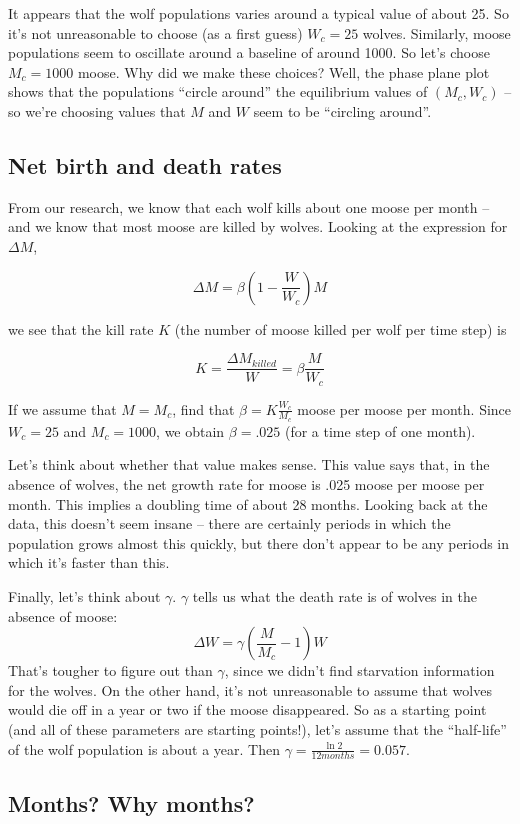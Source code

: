 \documentclass{tufte-handout}
\begin{document}
 It appears that the wolf populations varies around a typical value of about 25.  So it's not unreasonable to choose (as a first guess) $W_c = 25$ wolves.  Similarly, moose populations seem to oscillate around a baseline of around 1000.  So let's choose $M_c = 1000$ moose.  Why did we make these choices?  Well, the phase plane plot shows that the populations ``circle around'' the equilibrium values of $(M_c,W_c)$ -- so we're choosing values that $M$ and $W$ seem to be ``circling around''.

\subsection{Net birth and death rates}
From our research, we know that each wolf kills about one moose per month -- and we know that most moose are killed by wolves.  Looking at the expression for $\Delta M$, 

$$\Delta M = \beta(1-\frac{W}{W_c})M$$

we see that the kill rate $K$ (the number of moose killed per wolf per time step) is 

$$K = \frac{\Delta M_{killed}}{W} = \beta \frac{M}{W_c}$$

If we assume that $M=M_c$, find that  $ \beta = K \frac{W_c}{M_c}$ moose per moose per month.  Since $W_c = 25$ and $M_c = 1000$, we obtain $\beta = .025$ (for a time step of one month). 

Let's think about whether that value makes sense.  This value says that, in the absence of wolves, the net growth rate for moose is .025 moose per moose per month.  This implies a doubling time of about 28 months.   Looking back at the data, this doesn't seem insane -- there are certainly periods in which the population grows almost this quickly, but there don't appear to be any periods in which it's faster than this.

Finally, let's think about $\gamma$.  $\gamma$ tells us what the death rate is of wolves in the absence of moose:
$$\Delta W = \gamma(\frac{M}{M_c}-1)W$$
 That's tougher to figure out than $\gamma$, since we didn't find starvation information for the wolves.  On the other hand, it's not unreasonable to assume that wolves would die off in a year or two if the moose disappeared.  So as a starting point (and all of these parameters are starting points!), let's assume that the ``half-life'' of the wolf population is about a year.  Then $\gamma = \frac{\ln 2}{12 months} = 0.057$.

\subsection{Months?  Why months?}
\end{document}
